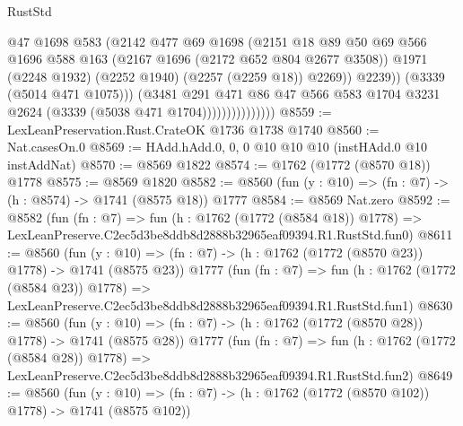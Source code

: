 \begin{lexlean}{RustStd}
\begin{coremodule}
                                  @47
                                  @1698
                                  @583
                                  (@2142
                                    @477
                                    @69
                                    @1698
                                    (@2151
                                      @18
                                      @89
                                      @50
                                      @69
                                      @566
                                      @1696
                                      @588
                                      @163
                                      (@2167 @1696 (@2172 @652 @804 @2677 @3508))
                                      @1971
                                      (@2248 @1932)
                                      (@2252 @1940)
                                      (@2257 (@2259 @18))
                                      @2269))
                                  @2239))
                              (@3339 (@5014 @471 @1075)))
                            (@3481
                              @291
                              @471
                              @86
                              @47
                              @566
                              @583
                              @1704
                              @3231
                              @2624
                              (@3339 (@5038 @471 @1704)))))))))))))))
@8559 := LexLeanPreservation.Rust.CrateOK @1736 @1738 @1740
@8560 := Nat.casesOn.{0}
@8569 := HAdd.hAdd.{0, 0, 0} @10 @10 @10 (instHAdd.{0} @10 instAddNat)
@8570 := @8569 @1822
@8574 := @1762 (@1772 (@8570 @18)) @1778
@8575 := @8569 @1820
@8582 := @8560 (fun (y : @10) => (fn : @7) -> (h : @8574) -> @1741 (@8575 @18)) @1777
@8584 := @8569 Nat.zero
@8592 := @8582
    (fun (fn : @7) =>
    fun (h : @1762 (@1772 (@8584 @18)) @1778) =>
    LexLeanPreserve.C2ec5d3be8ddb8d2888b32965eaf09394.R1.RustStd.fun0)
@8611 := @8560
    (fun (y : @10) => (fn : @7) -> (h : @1762 (@1772 (@8570 @23)) @1778) -> @1741 (@8575 @23))
    @1777
    (fun (fn : @7) =>
    fun (h : @1762 (@1772 (@8584 @23)) @1778) =>
    LexLeanPreserve.C2ec5d3be8ddb8d2888b32965eaf09394.R1.RustStd.fun1)
@8630 := @8560
    (fun (y : @10) => (fn : @7) -> (h : @1762 (@1772 (@8570 @28)) @1778) -> @1741 (@8575 @28))
    @1777
    (fun (fn : @7) =>
    fun (h : @1762 (@1772 (@8584 @28)) @1778) =>
    LexLeanPreserve.C2ec5d3be8ddb8d2888b32965eaf09394.R1.RustStd.fun2)
@8649 := @8560
    (fun (y : @10) => (fn : @7) -> (h : @1762 (@1772 (@8570 @102)) @1778) -> @1741 (@8575 @102))

\end{coremodule}
\end{lexlean}
